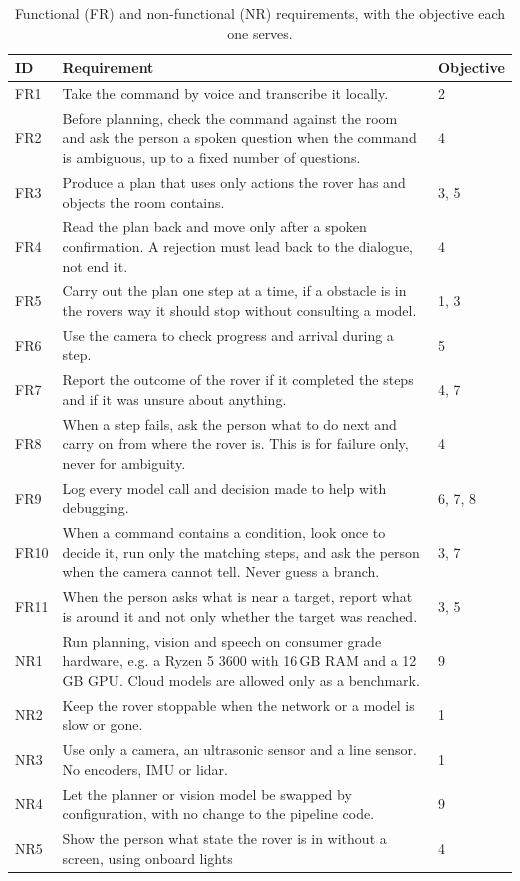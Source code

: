 \begin{table}[htbp]
  \centering
  \caption{Functional (FR) and non-functional (NR) requirements, with the objective each one serves.}
  \label{tab:requirements}
  \small
  \begin{tabular}{@{}l p{9.4cm} l@{}}
    \toprule
    ID & Requirement & Objective \\
    \midrule
    FR1 & Take the command by voice and transcribe it locally. & 2 \\
    FR2 & Before planning, check the command against the room and ask the person a spoken question when the command is ambiguous, up to a fixed number of questions. & 4 \\
    FR3 & Produce a plan that uses only actions the rover has and objects the room contains. & 3, 5 \\
    FR4 & Read the plan back and move only after a spoken confirmation. A rejection must lead back to the dialogue, not end it. & 4 \\
    FR5 & Carry out the plan one step at a time, if a obstacle is in the rovers way it should stop without consulting a model. & 1, 3 \\
    FR6 & Use the camera to check progress and arrival during a step. & 5 \\
    FR7 & Report the outcome of the rover if it completed the steps and if it was unsure about anything. & 4, 7 \\
    FR8 & When a step fails, ask the person what to do next and carry on from where the rover is. This is for failure only, never for ambiguity. & 4 \\
    FR9 & Log every model call and decision made to help with debugging. & 6, 7, 8 \\
    FR10 & When a command contains a condition, look once to decide it, run only the matching steps, and ask the person when the camera cannot tell. Never guess a branch. & 3, 7 \\
    FR11 & When the person asks what is near a target, report what is around it and not only whether the target was reached. & 3, 5 \\
    NR1 & Run planning, vision and speech on consumer grade hardware, e.g. a Ryzen 5 3600 with 16\,GB RAM and a 12\,GB GPU. Cloud models are allowed only as a benchmark. & 9 \\
    NR2 & Keep the rover stoppable when the network or a model is slow or gone. & 1 \\
    NR3 & Use only a camera, an ultrasonic sensor and a line sensor. No encoders, IMU or lidar. & 1 \\
    NR4 & Let the planner or vision model be swapped by configuration, with no change to the pipeline code. & 9 \\
    NR5 & Show the person what state the rover is in without a screen, using onboard lights& 4 \\
    \bottomrule
  \end{tabular}
\end{table}

